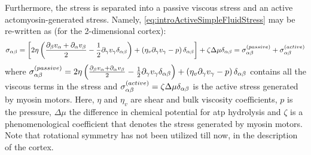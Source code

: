 Furthermore, the stress is separated into a passive viscous stress and an active actomyosin-generated stress. Namely, \autoref{eq:introActiveSimpleFluidStress} may be re-written as (for the 2-dimensional cortex):
\begin{equation}\label{eq:totalStressModelPG}
    \sigma_{\alpha\beta} = \left[2\eta \left(\frac{\inlinePartial{\beta}{v_\alpha} + \inlinePartial{\alpha}{v_\beta}}{2} - \frac{1}{2}\inlinePartial{\gamma}{v_\gamma}\delta_{\alpha\beta}\right) + \left(\eta_v\inlinePartial{\gamma}{v_\gamma} - p\right)\delta_{\alpha\beta}\right] + \zeta\Delta\mu \delta_{\alpha\beta} = \speciesSuper{\sigma}{passive}_{\alpha\beta} + \speciesSuper{\sigma}{active}_{\alpha\beta}
\end{equation}
where $\speciesSuper{\sigma}{passive}_{\alpha\beta} = 2\eta \left(\frac{\inlinePartial{\beta}{v_\alpha} + \inlinePartial{\alpha}{v_\beta}}{2} - \frac{1}{2}\inlinePartial{\gamma}{v_\gamma}\delta_{\alpha\beta}\right) + \left(\eta_v\inlinePartial{\gamma}{v_\gamma} - p\right)\delta_{\alpha\beta}$ contains all the viscous terms in the stress and $\sigma^{(active)}_{\alpha\beta} = \zeta\Delta\mu \delta_{\alpha\beta}$ is the active stress generated by myosin motors. Here, $\eta$ and $\eta_v$ are shear and bulk viscosity coefficients, $p$ is the pressure, $\Delta\mu$ the difference in chemical potential for \ac{atp} hydrolysis and $\zeta$ is a phenomenological coefficient that denotes the stress generated by myosin motors. Note that rotational symmetry has not been utilized till now, in the description of the cortex.


